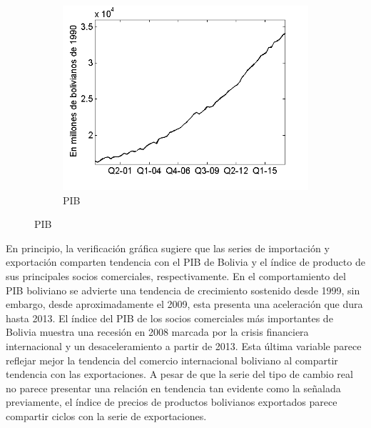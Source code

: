 \documentclass[12pt,letterpaper]{article}
\begin{document}
\begin{figure}
\begin{subfigure}[b]{0.4\textwidth}
        \includegraphics[width=\textwidth]{4pib}
        \caption{PIB}
        \label{4pib}
    \end{subfigure}
\end{figure}

En principio, la verificación gráfica sugiere que las series de importación y exportación comparten tendencia con el PIB de Bolivia y el índice de producto de sus principales socios comerciales, respectivamente. En el comportamiento del PIB boliviano se advierte una tendencia de crecimiento sostenido desde 1999, sin embargo, desde aproximadamente el 2009, esta presenta una aceleración que dura hasta 2013. El índice del PIB de los socios comerciales más importantes de Bolivia muestra una recesión en 2008 marcada por la crisis financiera internacional y un desaceleramiento a partir de 2013. Esta última variable parece reflejar mejor la tendencia del comercio internacional boliviano al compartir tendencia con las exportaciones. A pesar de que la serie del tipo de cambio real no parece presentar una relación en tendencia tan evidente como la señalada previamente, el índice de precios de productos bolivianos exportados parece compartir ciclos con la serie de exportaciones.
\end{document}
